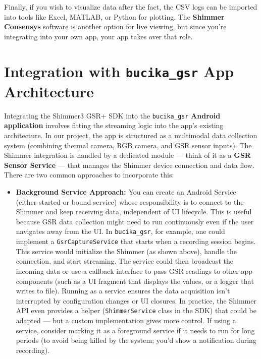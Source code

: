 {{Finally, if you wish to visualize data after the fact, the CSV logs can
be imported into tools like Excel, MATLAB, or Python for plotting. The
\textbf{Shimmer Consensys} software is another option for live viewing, but
since you're integrating into your own app, your app takes over that
role.

\section{Integration with \texttt{bucika_gsr} App Architecture}

Integrating the Shimmer3 GSR+ SDK into the \texttt{bucika_gsr} \textbf{Android
application} involves fitting the streaming logic into the app's
existing architecture. In our project, the app is structured as a
multimodal data collection system (combining thermal camera, RGB camera,
and GSR sensor
inputs)\cite{ref10}.
The Shimmer integration is handled by a dedicated module --- think of it
as a \textbf{GSR Sensor Service} --- that manages the Shimmer device
connection and data flow. There are two common approaches to incorporate
this:

\begin{itemize}
\item \textbf{Background Service Approach:} You can create an Android Service
  (either started or bound service) whose responsibility is to connect
  to the Shimmer and keep receiving data, independent of UI lifecycle.
  This is useful because GSR data collection might need to run
  continuously even if the user navigates away from the UI. In
  \texttt{bucika_gsr}, for example, one could implement a \texttt{GsrCaptureService}
  that starts when a recording session begins. This service would
  initialize the Shimmer (as shown above), handle the connection, and
  start streaming. The service could then broadcast the incoming data or
  use a callback interface to pass GSR readings to other app components
  (such as a UI fragment that displays the values, or a logger that
  writes to file). Running as a service ensures the data acquisition
  isn't interrupted by configuration changes or UI closures. In
  practice, the Shimmer API even provides a helper (\texttt{ShimmerService}
  class in the SDK) that could be adapted --- but a custom implementation
  gives more control. If using a service, consider marking it as a
  foreground service if it needs to run for long periods (to avoid being
  killed by the system; you'd show a notification during recording).


\end{itemize}}}
